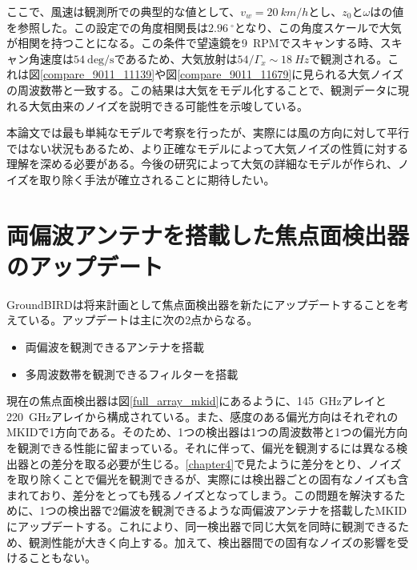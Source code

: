 ここで、風速は観測所での典型的な値として、$v_{w}=\SI{20}{km/h}$とし、$z_{0}$と$\omega$は\cite{nishinomiya}の値を参照した。この設定での角度相関長は$\SI{2.96}{^{\circ}}$となり、この角度スケールで大気が相関を持つことになる。この条件で望遠鏡を\SI{9}{RPM}でスキャンする時、スキャン角速度は$\SI{54}{\mathrm{deg/s}}$であるため、大気放射は$54/\Gamma_{x}\sim\SI{18}{Hz}$で観測される。これは図\ref{compare_9011_11139}や図\ref{compare_9011_11679}に見られる大気ノイズの周波数帯と一致する。この結果は大気をモデル化することで、観測データに現れる大気由来のノイズを説明できる可能性を示唆している。

本論文では最も単純なモデルで考察を行ったが、実際には風の方向に対して平行ではない状況もあるため、より正確なモデルによって大気ノイズの性質に対する理解を深める必要がある。今後の研究によって大気の詳細なモデルが作られ、ノイズを取り除く手法が確立されることに期待したい。
\section{両偏波アンテナを搭載した焦点面検出器のアップデート}
GroundBIRDは将来計画として焦点面検出器を新たにアップデートすることを考えている。アップデートは主に次の2点からなる。
\begin{itemize}
  \item 両偏波を観測できるアンテナを搭載
  \item 多周波数帯を観測できるフィルターを搭載
\end{itemize}
現在の焦点面検出器は図\ref{full_array_mkid}にあるように、\SI{145}{GHz}アレイと\SI{220}{GHz}アレイから構成されている。また、感度のある偏光方向はそれぞれのMKIDで1方向である。そのため、1つの検出器は1つの周波数帯と1つの偏光方向を観測できる性能に留まっている。それに伴って、偏光を観測するには異なる検出器との差分を取る必要が生じる。\ref{chapter4}で見たように差分をとり、ノイズを取り除くことで偏光を観測できるが、実際には検出器ごとの固有なノイズも含まれており、差分をとっても残るノイズとなってしまう。この問題を解決するために、1つの検出器で2偏波を観測できるような両偏波アンテナを搭載したMKIDにアップデートする。これにより、同一検出器で同じ大気を同時に観測できるため、観測性能が大きく向上する。加えて、検出器間での固有なノイズの影響を受けることもない。

